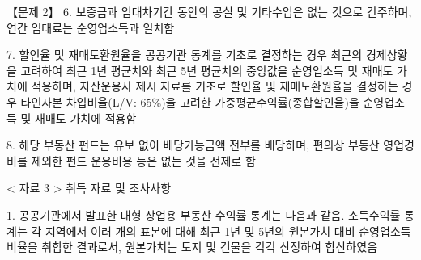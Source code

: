 \begin{longquestion}{【문제 2】}
6. 보증금과 임대차기간 동안의 공실 및 기타수입은 없는 것으로 간주하며, 연간 임대료는 순영업소득과 일치함 \par
7. 할인율 및 재매도환원율을 공공기관 통계를 기초로 결정하는 경우 최근의 경제상황을 고려하여 최근 1년 평균치와 최근 5년 평균치의 중앙값을 순영업소득 및 재매도 가치에 적용하며, 자산운용사 제시 자료를 기초로 할인율 및 재매도환원율을 결정하는 경우 타인자본 차입비율(L/V: 65\%)을 고려한 가중평균수익률(종합할인율)을 순영업소득 및 재매도 가치에 적용함 \par
8. 해당 부동산 펀드는 유보 없이 배당가능금액 전부를 배당하며, 편의상 부동산 영업경비를 제외한 펀드 운용비용 등은 없는 것을 전제로 함 \par
< 자료 3 > 취득 자료 및 조사사항 \par
1. 공공기관에서 발표한 대형 상업용 부동산 수익률 통계는 다음과 같음. 소득수익률 통계는 각 지역에서 여러 개의 표본에 대해 최근 1년 및 5년의 원본가치 대비 순영업소득 비율을 취합한 결과로서, 원본가치는 토지 및 건물을 각각 산정하여 합산하였음 \par
{\small\centering\renewcommand{\arraystretch}{1.25}
\par}

{\small\centering\renewcommand{\arraystretch}{1.25}
\par}


\end{longquestion}
